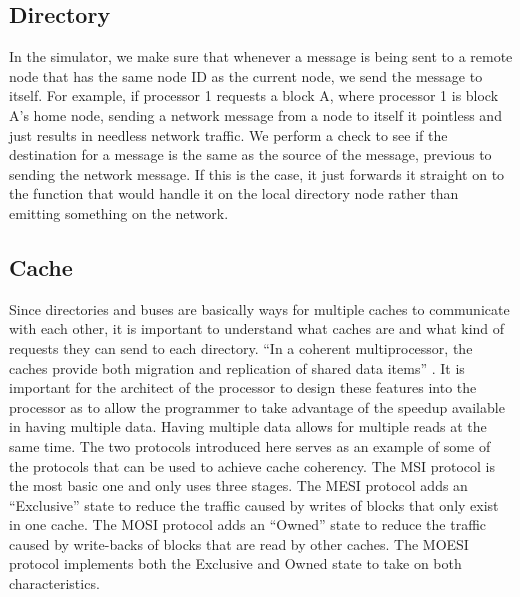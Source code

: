 \documentclass[letterpaper]{article}
\begin{document}
\subsection{Directory}
In the simulator, we make sure that whenever a message is being sent to a remote node that has the same node ID as the current node, we send the message to itself. For example, if processor 1 requests a block A, where processor 1 is block A's home node, sending a network message from a node to itself it pointless and just results in needless network traffic. We perform a check to see if the destination for a message is the same as the source of the message, previous to sending the network message. If this is the case, it just forwards it straight on to the function that would handle it on the local directory node rather than emitting something on the network.

\subsection[Cache]{\rmfamily Cache}
Since directories and buses are basically ways for multiple caches to communicate with each other, it is important to understand what caches are and what kind of requests they can send to each directory. ``In a coherent multiprocessor, the caches provide both migration and replication of shared data items'' \cite{HEN00}. It is important for the architect of the processor to design these features into the processor as to allow the programmer to take advantage of the speedup available in having multiple data. Having multiple data allows for multiple reads at the same time. The two protocols introduced here serves as an example of some of the protocols that can be used to achieve cache coherency. The MSI protocol is the most basic one and only uses three stages. The MESI protocol adds an ``Exclusive'' state to reduce the traffic caused by writes of blocks that only exist in one cache. The MOSI protocol adds an ``Owned'' state to reduce the traffic caused by write-backs of blocks that are read by other caches. The MOESI protocol implements both the Exclusive and Owned state to take on both characteristics.
\end{document}
